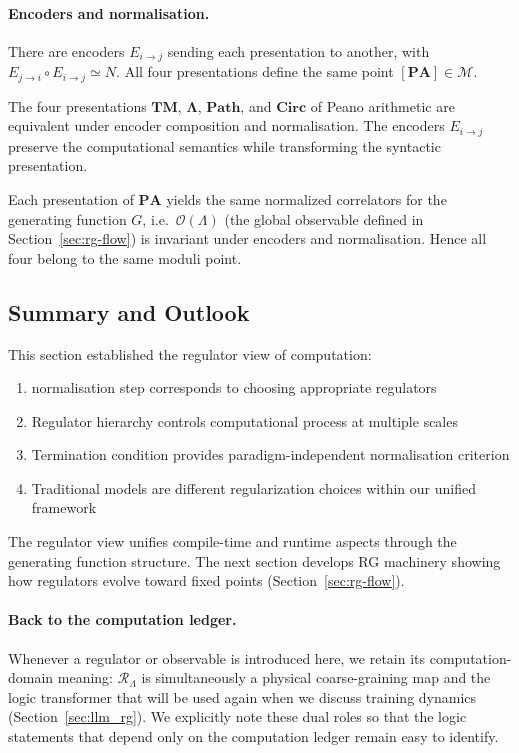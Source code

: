 \paragraph{Encoders and normalisation.}
There are encoders $E_{i\to j}$ sending each presentation to another,
with $E_{j\to i}\circ E_{i\to j}\simeq N$.
All four presentations define the same point $[\mathbf{PA}]\in\mathcal{M}$.

\begin{conjecture}
\label{conj:alignment}
The four presentations $\mathbf{TM}$, $\mathbf{\Lambda}$, $\mathbf{Path}$, and $\mathbf{Circ}$ of Peano arithmetic are equivalent under encoder composition and normalisation. The encoders $E_{i\to j}$ preserve the computational semantics while transforming the syntactic presentation.
\end{conjecture}

\begin{proposition}
Each presentation of $\mathbf{PA}$ yields the same normalized correlators for
the generating function $G$, i.e.\ $\mathcal{O}(\Lambda)$ (the global observable defined in Section~\ref{sec:rg-flow})
is invariant under encoders and normalisation. Hence all four belong to the same moduli point.
\end{proposition}

\subsection{Summary and Outlook}

This section established the regulator view of computation:

\begin{enumerate}
\item normalisation step corresponds to choosing appropriate regulators
\item Regulator hierarchy controls computational process at multiple scales
\item Termination condition provides paradigm-independent normalisation criterion
\item Traditional models are different regularization choices within our unified framework
\end{enumerate}

The regulator view unifies compile-time and runtime aspects through the generating function structure. The next section develops RG machinery showing how regulators evolve toward fixed points (Section~\ref{sec:rg-flow}).

\paragraph{Back to the computation ledger.} Whenever a regulator or observable is introduced here, we retain its computation-domain meaning: $\mathcal{R}_\Lambda$ is simultaneously a physical coarse-graining map and the logic transformer that will be used again when we discuss training dynamics (Section~\ref{sec:llm_rg}). We explicitly note these dual roles so that the logic statements that depend only on the computation ledger remain easy to identify.

